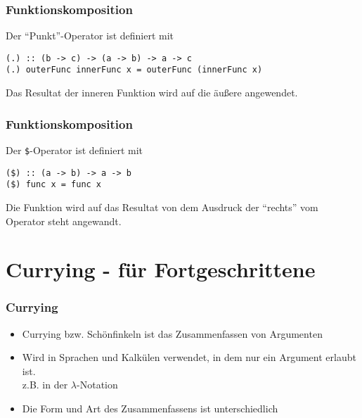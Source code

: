 \begin{frame}[fragile]
\frametitle{Funktionskomposition}
\begin{block}{Der "`Punkt"'-Operator ist definiert mit}
\begin{lstlisting}
(.) :: (b -> c) -> (a -> b) -> a -> c
(.) outerFunc innerFunc x = outerFunc (innerFunc x)
\end{lstlisting}
Das Resultat der inneren Funktion wird auf die äußere angewendet.
\end{block}
\end{frame}

\begin{frame}[fragile]
\frametitle{Funktionskomposition}
\begin{block}{Der \lstinline|$|-Operator ist definiert mit}
\begin{lstlisting}
($) :: (a -> b) -> a -> b
($) func x = func x
\end{lstlisting}
Die Funktion wird auf das Resultat von dem Ausdruck der "`rechts"' vom Operator steht angewandt.
\end{block}
\end{frame}

\section{Currying - für Fortgeschrittene}
\begin{frame}
\frametitle{Currying}
\begin{block}{\vspace*{-3ex}}
\begin{itemize}
  \item Currying bzw. Schönfinkeln ist das Zusammenfassen von Argumenten
  \item Wird in Sprachen und Kalkülen verwendet, in dem nur ein Argument erlaubt ist.\\
  		z.B. in der $\lambda$-Notation
  \item Die Form und Art des Zusammenfassens ist unterschiedlich 
\end{itemize}
\end{block}
\end{frame}

